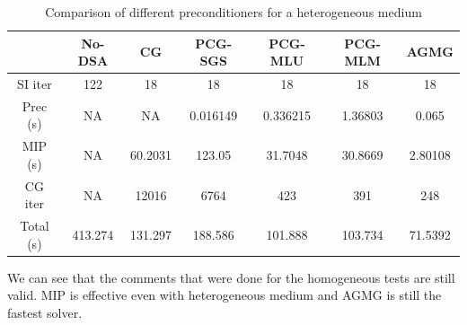\begin{table}[H]
  \begin{center}
    \caption{Comparison of different preconditioners for a heterogeneous medium}
    \begin{tabular}{|c|c|c|c|c|c|c|}
      \hline
      & No-DSA & CG & PCG-SGS & PCG-MLU & PCG-MLM & AGMG\\
      \hline
      SI iter   & 122      & 18      & 18       & 18       & 18      & 18 \\
      Prec (s)  & NA       & NA      & 0.016149 & 0.336215 & 1.36803 & 0.065 \\
      MIP (s)   & NA       & 60.2031 & 123.05   & 31.7048  & 30.8669 & 2.80108\\
      CG iter   & NA       & 12016   & 6764     & 423      & 391     & 248 \\
      Total (s) & 413.274  & 131.297 & 188.586  & 101.888  & 103.734 & 71.5392\\
      \hline
    \end{tabular}
  \end{center}
\end{table}
We can see that the comments that were done for the homogeneous tests are
still valid. MIP is effective even with heterogeneous medium and AGMG is
still the fastest solver.

